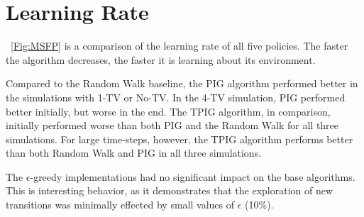 \documentclass[12pt]{thesis}
\begin{document}
\section{Learning Rate}
\figurename~\ref{Fig:MSFP} is a comparison of the learning rate of all five policies. The faster the algorithm decreases, the faster it is learning about its environment.

Compared to the Random Walk baseline, the PIG algorithm performed better in the simulations with 1-TV or No-TV. In the 4-TV simulation, PIG performed better initially, but worse in the end. The TPIG algorithm, in comparison, initially performed worse than both PIG and the Random Walk for all three simulations. For large time-steps, however, the TPIG algorithm performs better than both Random Walk and PIG in all three simulations.

The $\epsilon$-greedy implementations had no significant impact on the base algorithms. This is interesting behavior, as it demonstrates that the exploration of new transitions was minimally effected by small values of $\epsilon$ (10\%).
\end{document}
